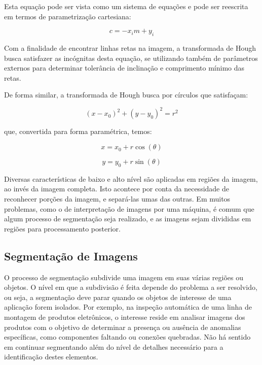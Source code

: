 Esta equação pode ser vista como um sistema de equações e pode ser reescrita em termos de parametrização cartesiana:

\begin{equation}
	\displaystyle c = -x_im + y_i
\end{equation}

Com a finalidade de encontrar linhas retas na imagem, a transformada de Hough busca satisfazer as incógnitas desta equação, se utilizando também de parâmetros externos para determinar tolerância de inclinação e comprimento mínimo das retas.

De forma similar, a transformada de Hough busca por círculos que satisfaçam:

\begin{equation}
	\displaystyle (x-x_0)^2 + (y-y_0)^2 = r^2
\end{equation}

que, convertida para forma paramétrica, temos:


\begin{equation}
	\displaystyle x = x_0 +r \cos(\theta)
\end{equation}

\begin{equation}
	\displaystyle y = y_0 +r \sin(\theta)
\end{equation}


Diversas características de baixo e alto nível são aplicadas em regiões da imagem, ao invés da imagem completa. Isto acontece por conta da necessidade de reconhecer porções da imagem, e separá-las umas das outras. Em muitos problemas, como o de interpretação de imagens por uma máquina, é comum que algum processo de segmentação seja realizado, e as imagens sejam divididas em regiões para processamento posterior.

\subsection{Segmentação de Imagens}

O processo de segmentação subdivide uma imagem em suas várias regiões ou objetos. O nível em que a subdivisão é feita depende do problema a ser resolvido, ou seja, a segmentação deve parar quando os objetos de interesse de uma aplicação forem isolados. Por exemplo, na inspeção automática de uma linha de montagem de produtos eletrônicos, o interesse reside em analisar imagens dos produtos com o objetivo de determinar a presença ou ausência de anomalias específicas, como componentes faltando ou conexões quebradas. Não há sentido em continuar segmentando além do nível de detalhes necessário para a identificação destes elementos.

